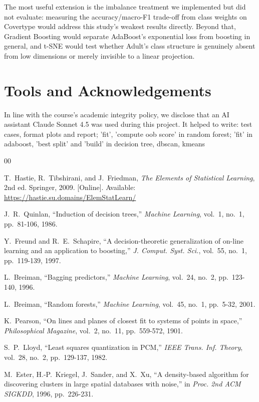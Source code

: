 \documentclass[conference]{IEEEtran}
\begin{document}
The most useful extension is the imbalance treatment we implemented but did
not evaluate: measuring the accuracy/macro-F1 trade-off from class weights
on Covertype would address this study's weakest results directly.  Beyond
that, Gradient Boosting would separate AdaBoost's exponential loss from
boosting in general, and t-SNE would test whether Adult's class structure
is genuinely absent from low dimensions or merely invisible to a linear
projection.

\section*{Tools and Acknowledgements}
In line with the course's academic integrity policy, we disclose that an AI
assistant Claude Sonnet 4.5 was used during this project.  It helped to write:
test cases, format plots and report; 'fit', 'compute oob score' in random forest; 'fit' in adaboost, 'best split' and 'build' in decision tree, dbscan, kmeans 

\begin{thebibliography}{00}

T.~Hastie, R.~Tibshirani, and J.~Friedman,
\textit{The Elements of Statistical Learning}, 2nd ed.
Springer, 2009.
[Online]. Available: \url{https://hastie.su.domains/ElemStatLearn/}

J.~R.~Quinlan,
``Induction of decision trees,''
\textit{Machine Learning}, vol.~1, no.~1, pp.~81-106, 1986.

Y.~Freund and R.~E.~Schapire,
``A decision-theoretic generalization of on-line learning and an
application to boosting,''
\textit{J. Comput. Syst. Sci.}, vol.~55, no.~1, pp.~119-139, 1997.

L.~Breiman,
``Bagging predictors,''
\textit{Machine Learning}, vol.~24, no.~2, pp.~123-140, 1996.

L.~Breiman,
``Random forests,''
\textit{Machine Learning}, vol.~45, no.~1, pp.~5-32, 2001.

K.~Pearson,
``On lines and planes of closest fit to systems of points in space,''
\textit{Philosophical Magazine}, vol.~2, no.~11, pp.~559-572, 1901.

S.~P.~Lloyd,
``Least squares quantization in PCM,''
\textit{IEEE Trans. Inf. Theory}, vol.~28, no.~2, pp.~129-137, 1982.

M.~Ester, H.-P.~Kriegel, J.~Sander, and X.~Xu,
``A density-based algorithm for discovering clusters in large
spatial databases with noise,''
in \textit{Proc. 2nd ACM SIGKDD}, 1996, pp.~226-231.

\end{thebibliography}

% 
\end{document}
